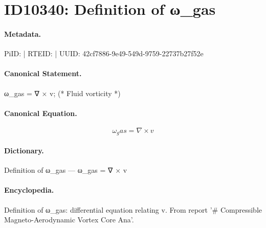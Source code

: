 \section*{ID10340: Definition of ω\_gas}
\paragraph{Metadata.}
PiID:  | RTEID:  | UUID: 42cf7886-9e49-549d-9759-22737b27f52e

\paragraph{Canonical Statement.}
ω\_gas = ∇ × v; (* Fluid vorticity *)

\paragraph{Canonical Equation.}
\[
ω_gas = ∇ × v
\]

\paragraph{Dictionary.}
Definition of ω\_gas — ω\_gas = ∇ × v

\paragraph{Encyclopedia.}
Definition of ω\_gas: differential equation relating v. From report '\# Compressible Magneto-Aerodynamic Vortex Core Ana'.
